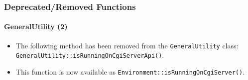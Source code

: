 
\begin{frame}[fragile]
	\frametitle{Deprecated/Removed Functions}
	\framesubtitle{GeneralUtility (2)}

	\begin{itemize}
		\item The following method has been removed from the \texttt{GeneralUtility} class:
			\texttt{GeneralUtility::isRunningOnCgiServerApi()}.
		\item This function is now available as\newline
			\texttt{Environment::isRunningOnCgiServer()}.

	\end{itemize}

\end{frame}


